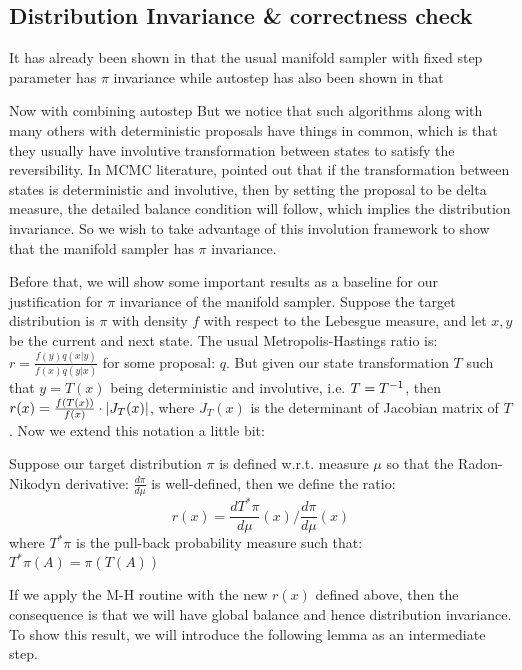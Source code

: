 \documentclass{article}
\begin{document}
\subsection{Distribution Invariance \& correctness check}
It has already been shown in \cite{manifoldparent} that the usual manifold sampler with fixed step parameter has $\pi$ invariance while autostep has also been shown in \cite{autostep} that


Now with combining autostep But we notice that such algorithms along with many others with deterministic proposals have things in common, which is that they usually have involutive transformation between states to satisfy the reversibility. In MCMC literature, \cite{tierney1998} pointed out that if the transformation between states is deterministic and involutive, then by setting the proposal to be delta measure, the detailed balance condition will follow, which implies the distribution invariance. So we wish to take advantage of this involution framework to show that the manifold sampler has $\pi$ invariance.

Before that, we will show some important results as a baseline for our justification for $\pi$ invariance of the manifold sampler. Suppose the target distribution is $\pi$ with density $f$ with respect to the Lebesgue measure, and let $x, y$ be the current and next state. The usual Metropolis-Hastings ratio is: $r = \frac{f(y) q(x | y)}{f(x) q(y | x)}$ for some proposal: $q$. But given our state transformation $T$ such that $y = T(x)$ being deterministic and involutive, i.e. $T = T^{-1}$, then $r(x) = \frac{f(T(x))}{f(x)} \cdot \left|J_T(x)\right|$, where $J_T(x)$ is the determinant of Jacobian matrix of $T$. Now we extend this notation a little bit:

Suppose our target distribution $\pi$ is defined w.r.t. measure $\mu$ so that the Radon-Nikodyn derivative: $\frac{d\pi}{d\mu}$ is well-defined, then we define the ratio: \[r(x) = \frac{d T^*\pi}{d\mu}(x) / \frac{d\pi}{d\mu}(x)\]where $T^*\pi$ is the pull-back probability measure such that: $T^*\pi(A) = \pi(T(A))$

If we apply the M-H routine with the new $r(x)$ defined above, then the consequence is that we will have global balance and hence distribution invariance. To show this result, we will introduce the following lemma as an intermediate step.

\end{document}

